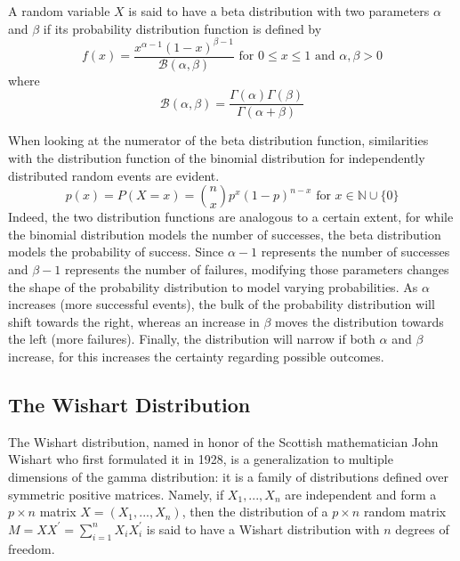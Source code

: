\documentclass[12pt]{article}
\newcommand{\B}{\mathcal{B}}
\begin{document}
A random variable $X$ is said to have a beta distribution with two parameters $\alpha$ and $\beta$ if its probability
distribution function is defined by
\begin{equation}
	f(x) = \frac{x^{\alpha-1} (1-x)^{\beta-1}}{\B(\alpha, \beta)}\text{ for } 0\leq x\leq 1\text{ and }\alpha, \beta > 0
\end{equation}
where
\begin{equation}
	\B(\alpha, \beta) = \frac{\Gamma(\alpha)\Gamma(\beta)}{\Gamma(\alpha+\beta)}
\end{equation}

When looking at the numerator of the beta distribution function, similarities with the distribution function of the
binomial distribution for independently distributed random events are evident.
\begin{equation}
	p(x) = P(X=x) =\binom{n}{x}p^x(1-p)^{n-x}\text{ for }x\in\mathbb{N}\cup\{0\}
\end{equation}
Indeed, the two distribution functions are analogous to a certain extent, for while the binomial distribution models the
number of successes, the beta distribution models the probability of success.  Since  $\alpha-1$ represents the number
of successes and $\beta-1$ represents the number of failures, modifying those parameters changes the shape of the
probability distribution to model varying probabilities. As $\alpha$ increases (more successful events), the bulk of the
probability distribution will shift towards the right, whereas an increase in $\beta$ moves the distribution towards the
left (more failures). Finally, the distribution will narrow if both $\alpha$ and $\beta$ increase, for this increases the
certainty regarding possible outcomes.


\pagebreak
\subsection{The Wishart Distribution}
The Wishart distribution, named in honor of the Scottish mathematician John Wishart who first formulated it in 1928, is
a generalization to multiple dimensions of the gamma distribution: it is a  family of distributions defined over symmetric
positive matrices. Namely, if $X_1, ..., X_n$ are independent and form a $p\times n$ matrix $X =  (X_1, ..., X_n)$, then
the distribution of a $p\times n$ random matrix $M = XX^\prime = \sum^n_{i=1}X_iX^\prime_i$ is said to have a Wishart
distribution with $n$ degrees of freedom.
\end{document}
